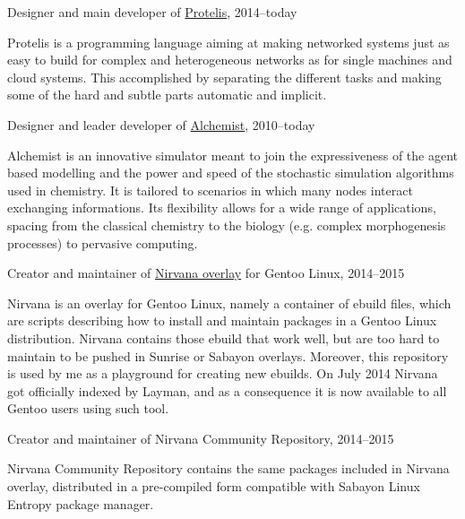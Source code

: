 \documentclass[10pt]{article}
\newenvironment{innerlist}[1][\enskip\textbullet]%
        {\begin{compactitem}[#1]}{\end{compactitem}}
\newcommand{\halfblankline}{\quad\vspace{-0.5\baselineskip}\pagebreak[3]}
\begin{document}
Designer and main developer of \href{http://protelis.org/}{Protelis}, 2014--today
\begin{innerlist}
    \item Protelis is a programming language aiming at making networked systems just as easy to build for complex and heterogeneous networks as for single machines and cloud systems. This accomplished by separating the different tasks and making some of the hard and subtle parts automatic and implicit.
\end{innerlist}
\halfblankline

Designer and leader developer of \href{http://alchemist.apice.unibo.it/}{Alchemist}, 2010--today
\begin{innerlist}
    \item Alchemist is an innovative simulator meant to join the expressiveness of the agent based modelling and the power and speed of the stochastic simulation algorithms used in chemistry. It is tailored to scenarios in which many nodes interact exchanging  informations. Its flexibility allows for a wide range of applications, spacing from the classical chemistry to the biology (e.g. complex morphogenesis processes) to pervasive computing.
\end{innerlist}
\halfblankline

Creator and maintainer of \href{https://bitbucket.org/danysk/nirvana-overlay/}{Nirvana overlay} for Gentoo Linux, 2014--2015
\begin{innerlist}
    \item Nirvana is an overlay for Gentoo Linux, namely a container of ebuild files, which are scripts describing how to install and maintain packages in a Gentoo Linux distribution. Nirvana contains those ebuild that work well, but are too hard to maintain to be pushed in Sunrise or Sabayon overlays. Moreover, this repository is used by me as a playground for creating new ebuilds. On July 2014 Nirvana got officially indexed by Layman, and as a consequence it is now available to all Gentoo users using such tool.
\end{innerlist}
\halfblankline

Creator and maintainer of {Nirvana Community Repository}, 2014--2015
\begin{innerlist}
    \item Nirvana Community Repository contains the same packages included in Nirvana overlay, distributed in a pre-compiled form compatible with Sabayon Linux Entropy package manager.
\end{innerlist}
\halfblankline
\end{document}
